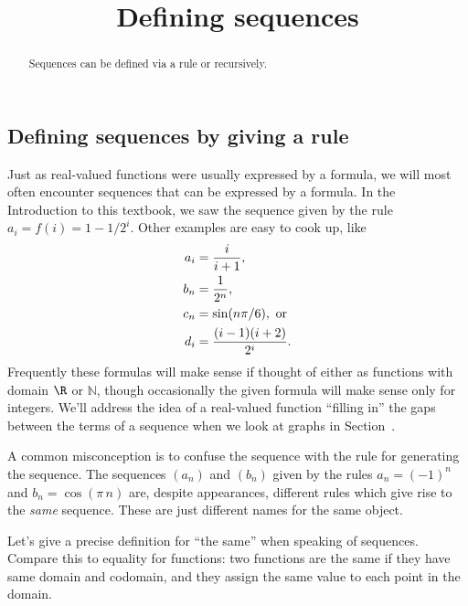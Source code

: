 \documentclass{ximera}
\title{Defining sequences}
\newcommand{\ds}{\displaystyle}
\newcommand{\N}{\mathbb{N}}
\begin{document}
\begin{abstract}
  Sequences can be defined via a rule or recursively.
\end{abstract}

\maketitle

\subsection{Defining sequences by giving a rule}

Just as real-valued functions were usually expressed by a formula, we
will most often encounter sequences that can be expressed by a
formula.  In the Introduction to this textbook, we saw the sequence
given by the rule $\ds a_i=f(i)=1-1/2^i$.  Other examples are easy to
cook up, like
\begin{align*}
  a_i &={i\over i+1}, \\
  b_n &={1\over2^n}, \\
  c_n &=\sin(n\pi/6), \mbox{ or} \\
  d_i &={(i-1)(i+2)\over2^i}. \\
\end{align*}
Frequently these formulas will make sense if thought of either as
functions with domain $\R$ or $\N$, though occasionally the given
formula will make sense only for integers.  We'll address the
idea of a real-valued function ``filling in'' the gaps between the
terms of a sequence when we look at graphs in
Section~.

\begin{warning}
  A common misconception is to confuse the sequence with the rule for
  generating the sequence.  The sequences $(a_n)$ and $(b_n)$ given by
  the rules $a_n = (-1)^n$ and $b_n = \cos (\pi \, n)$ are, despite
  appearances, different rules which give rise to the \textit{same}
  sequence.  These are just different names for the same object.
\end{warning}

Let's give a precise definition for ``the same'' when speaking of
sequences.  Compare this to equality for functions: two functions are
the same if they have same domain and codomain, and they assign the
same value to each point in the domain.

\end{document}
